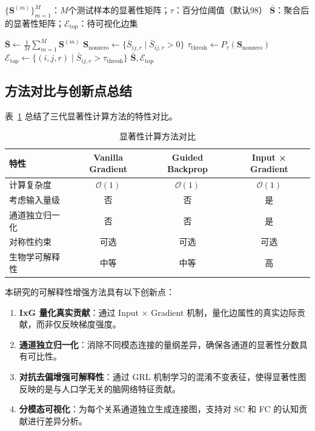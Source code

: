 \begin{algorithm}
  \centering
  \caption{群体水平显著性聚合与可视化筛选}
  \label{alg:saliency_aggregation}
  \small
  \begin{algorithmic}[1]
  \REQUIRE $\{\mathbf{S}^{(m)}\}_{m=1}^{M}$：$M$个测试样本的显著性矩阵；$\tau$：百分位阈值（默认98）
  \ENSURE $\bar{\mathbf{S}}$：聚合后的显著性矩阵；$\mathcal{E}_{\text{top}}$：待可视化边集

  \STATE {}
  \STATE $\bar{\mathbf{S}} \leftarrow \frac{1}{M} \sum_{m=1}^{M} \mathbf{S}^{(m)}$
  \STATE {}
  \STATE $\mathbf{S}_{\text{nonzero}} \leftarrow \{ \bar{S}_{ij,r} \mid \bar{S}_{ij,r} > 0 \}$
  \STATE $\tau_{\text{thresh}} \leftarrow P_{\tau}(\mathbf{S}_{\text{nonzero}})$
  \STATE {}
  \STATE $\mathcal{E}_{\text{top}} \leftarrow \{ (i,j,r) \mid \bar{S}_{ij,r} > \tau_{\text{thresh}} \}$
  \RETURN $\bar{\mathbf{S}}, \mathcal{E}_{\text{top}}$
  \end{algorithmic}
\end{algorithm}

\subsection{方法对比与创新点总结}

表~\ref{tab:interpretability_comparison} 总结了三代显著性计算方法的特性对比。

\begin{table}[htbp]
\centering
\caption{显著性计算方法对比}
\label{tab:interpretability_comparison}
\begin{tabular}{lccc}
\toprule
特性 & Vanilla Gradient & Guided Backprop & Input × Gradient \\
\midrule
计算复杂度 & $\mathcal{O}(1)$ & $\mathcal{O}(1)$ & $\mathcal{O}(1)$ \\
考虑输入量级 & 否 & 否 & 是 \\
通道独立归一化 & 否 & 否 & 是 \\
对称性约束 & 可选 & 可选 & 可选 \\
生物学可解释性 & 中等 & 中等 & 高 \\
\bottomrule
\end{tabular}
\end{table}

本研究的可解释性增强方法具有以下创新点：

\begin{enumerate}
    \item \textbf{IxG 量化真实贡献}：通过 Input × Gradient 机制，量化边属性的真实边际贡献，而非仅反映梯度强度。

    \item \textbf{通道独立归一化}：消除不同模态连接的量纲差异，确保各通道的显著性分数具有可比性。

    \item \textbf{对抗去偏增强可解释性}：通过 GRL 机制学习的混淆不变表征，使得显著性图反映的是与人口学无关的脑网络特征贡献。

    \item \textbf{分模态可视化}：为每个关系通道独立生成连接图，支持对 SC 和 FC 的认知贡献进行差异分析。
\end{enumerate}


